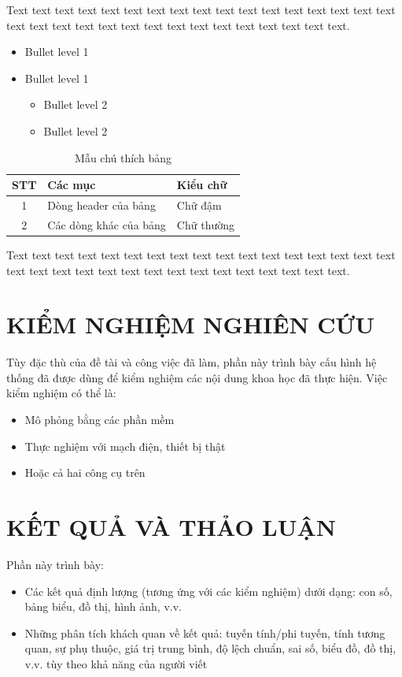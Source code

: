 \documentclass[12pt,a4paper]{report}
\begin{document}
Text text text text text text text text text text text text text text text text text text text text text text text text text text text text text text text text.

\begin{itemize}
    \item Bullet level 1
    \item Bullet level 1
    \begin{itemize}
        \item Bullet level 2
        \item Bullet level 2
    \end{itemize}
\end{itemize}

\begin{table}[h]
    \centering
    \caption{Mẫu chú thích bảng}
    \label{tab:mau}
    \renewcommand{\arraystretch}{1.2}
    \begin{tabular}{|c|l|l|}
        \hline
        \textbf{STT} & \textbf{Các mục} & \textbf{Kiểu chữ} \\
        \hline
        1 & Dòng header của bảng & Chữ đậm \\
        \hline
        2 & Các dòng khác của bảng & Chữ thường \\
        \hline
    \end{tabular}
\end{table}

Text text text text text text text text text text text text text text text text text text text text text text text text text text text text text text text text.

\chapter{KIỂM NGHIỆM NGHIÊN CỨU}
Tùy đặc thù của đề tài và công việc đã làm, phần này trình bày cấu hình hệ thống đã được dùng để kiểm nghiệm các nội dung khoa học đã thực hiện. Việc kiểm nghiệm có thể là:
\begin{itemize}
    \item Mô phỏng bằng các phần mềm
    \item Thực nghiệm với mạch điện, thiết bị thật
    \item Hoặc cả hai công cụ trên
\end{itemize}

\chapter{KẾT QUẢ VÀ THẢO LUẬN}
Phần này trình bày:
\begin{itemize}
    \item Các kết quả định lượng (tương ứng với các kiểm nghiệm) dưới dạng: con số, bảng biểu, đồ thị, hình ảnh, v.v.
    \item Những phân tích khách quan về kết quả: tuyến tính/phi tuyến, tính tương quan, sự phụ thuộc, giá trị trung bình, độ lệch chuẩn, sai số, biểu đồ, đồ thị, v.v. tùy theo khả năng của người viết
\end{itemize}
\end{document}
